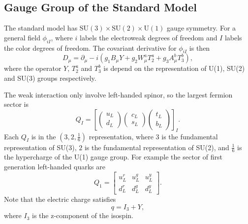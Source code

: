 \subsection{Gauge Group of the Standard Model}

The standard model has $\mathrm{SU(3)}\times\mathrm{SU(2)}\times\mathrm{U(1)}$ gauge symmetry.
For a general field $\phi_{iI}$, where $i$ labels the electroweak degrees of freedom and $I$ labels the color degrees of freedom.
The covariant derivative for $\phi_{iI}$ is then
\begin{equation}
	D_\mu = \partial_\mu -i \left(g_1 B_\mu Y + g_2 W^a_\mu T^a_{2} + g_3 A_\mu^b T^b_3                                                  \right),
\end{equation}
where the operator $Y$, $T_2^a$ and $T_3^b$ is depend on the representation of U(1), SU(2) and SU(3) groups respectively. 

The weak interaction only involve left-handed spinor, so the largest fermion sector is
\begin{equation}
	Q_I = \left[
		\begin{pmatrix} u_L \\ d_L \end{pmatrix} 
		\begin{pmatrix} c_L \\ s_L \end{pmatrix} 
		\begin{pmatrix} t_L \\ b_L \end{pmatrix}
	\right]_I.
\end{equation}
Each $Q_I$ is in the $\left(3,2,\frac{1}{6}\right)$ representation, where $3$ is the fundamental representation of SU(3), $2$ is the fundamental representation of SU(2), and $\frac{1}{6}$ is the hypercharge of the U(1) gauge group.
For example the sector of first generation left-handed quarks are
\begin{equation}
	Q_1 = \begin{bmatrix}
		u_L^r & u_L^g & u_L^y \\ d_L^r & d_L^g & d_L^y
	\end{bmatrix}.
\end{equation}
Note that the electric charge satisfies
\begin{equation}
	q = I_3 + Y,
\end{equation}
where $I_3$ is the z-component of the isospin.

